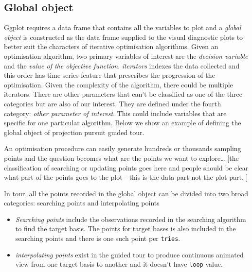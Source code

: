 \documentclass[12pt]{article}
\begin{document}
\hypertarget{global-object}{%
\subsection{Global object}\label{global-object}}

Ggplot requires a data frame that contains all the variables to plot and
a \emph{global object} is constructed as the data frame supplied to the
visual diagnostic plots to better suit the characters of iterative
optimisation algorithms. Given an optimisation algorithm, two primary
variables of interest are the \emph{decision variable} and the
\emph{value of the objective function}. \emph{iterators} indexes the
data collected and this order has time series feature that prescribes
the progression of the optimisation. Given the complexity of the
algorithm, there could be multiple iterators. There are other parameters
that can't be classified as one of the three categories but are also of
our interest. They are defined under the fourth category: \emph{other
parameter of interest}. This could include variables that are specific
for one particular algorithm. Below we show an example of defining the
global object of projection pursuit guided tour.

An optimisation procedure can easily generate hundreds or thousands
sampling points and the question becomes what are the points we want to
explore\ldots{} {[}the classification of searching or updating points
goes here and people should be clear what part of the points goes to the
plot - this is the data part not the plot part. {]}

In tour, all the points recorded in the global object can be divided
into two broad categories: searching points and interpolating points

\begin{itemize}
\item
  \emph{Searching points} include the observations recorded in the
  searching algorithm to find the target basis. The points for target
  bases is also included in the searching points and there is one such
  point per \texttt{tries}.
\item
  \emph{interpolating points} exist in the guided tour to produce
  continuous animated view from one target basis to another and it
  doesn't have \texttt{loop} value.
\end{itemize}
\end{document}
